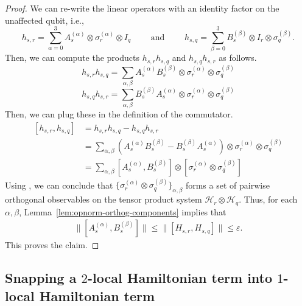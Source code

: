 \documentclass[11pt]{article}
\theoremstyle{plain}
\newcommand{\eps}{\varepsilon}
\newcommand{\IslamNote}[1]{\textcolor{orange}{(Islam: #1)}}
\newcommand{\IslamNote}[1]{}
\begin{document}
\begin{proof}
We can re-write the linear operators with an identity factor on the unaffected qubit, i.e.,
    \begin{equation}
        h_{s,r} = \sum\limits_{\alpha = 0}^{3} A_s^{(\alpha)} \otimes \sigma_r^{(\alpha)} \otimes I_{q}\quad\quad\text{ and } \quad\quad h_{s,q} = \sum\limits_{\beta = 0}^{3} B_s^{(\beta)} \otimes I_r \otimes \sigma_q^{(\beta)}.
    \end{equation}
Then, we can compute the products $h_{s,r} h_{s,q}$ and $h_{s,q} h_{s,r}$ as follows.
\begin{equation}
    h_{s,r} h_{s,q} = \sum\limits_{\alpha, \beta} A_s^{(\alpha)} B_s^{(\beta)} \otimes \sigma_r^{(\alpha)} \otimes \sigma_q^{(\beta)}
\end{equation}
\begin{equation}
    h_{s,q} h_{s,r} = \sum\limits_{\alpha, \beta}  B_s^{(\beta)} A_s^{(\alpha)} \otimes \sigma_r^{(\alpha)} \otimes \sigma_q^{(\beta)}
\end{equation}
Then, we can plug these in the definition of the commutator.
\begin{align*}
    \left[h_{s,r}, h_{s,q}\right] &= h_{s,r} h_{s,q} - h_{s,q} h_{s,r}\\
    &= \sum\limits_{\alpha, \beta} \left(A_s^{(\alpha)} B_s^{(\beta)} - B_s^{(\beta)} A_s^{(\alpha)}\right) \otimes \sigma_r^{(\alpha)} \otimes \sigma_q^{(\beta)}\\
    &= \sum\limits_{\alpha, \beta} \left[A_s^{(\alpha)}, B_s^{(\beta)} \right] \otimes \left[\sigma_r^{(\alpha)} \otimes \sigma_q^{(\beta)}\right]
\end{align*}
Using %
, we can conclude that $\{\sigma_r^{(\alpha)} \otimes \sigma_q^{(\beta)}\}_{\alpha,\beta}$ forms a set of pairwise orthogonal observables on the tensor product system $\mathcal{H}_r \otimes \mathcal{H}_q$. Thus, for each $\alpha, \beta$, Lemma~\ref{lem:opnorm-orthog-components} implies that 
\begin{align}
\|[A_s^{(\alpha)}, B_s^{(\beta)}]\| \leq \|[H_{s, r}, H_{s, q}]\| \leq \eps.
\end{align}
This proves the claim.
\end{proof}

\subsection{Snapping a $2$-local Hamiltonian term into $1$-local Hamiltonian term}
\end{document}
